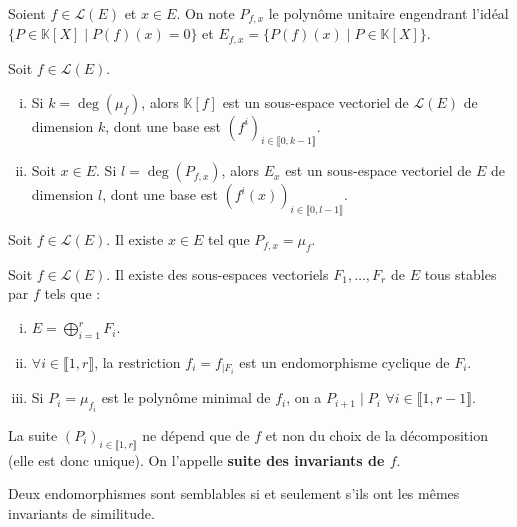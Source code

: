 	
	\begin{notation}
		Soient $f \in \mathcal{L}(E)$ et $x \in E$. On note $P_{f,x}$ le polynôme unitaire engendrant l'idéal $\{ P \in \mathbb{K}[X] \mid P(f)(x) = 0 \}$ et $E_{f,x} = \{ P(f)(x) \mid P \in \mathbb{K}[X] \}$.
	\end{notation}

	\begin{lemma}
		Soit $f \in \mathcal{L}(E)$.
		\begin{enumerate}[(i)]
			\item Si $k = \deg(\mu_f)$, alors $\mathbb{K}[f]$ est un sous-espace vectoriel de $\mathcal{L}(E)$ de dimension $k$, dont une base est $(f^i)_{i \in \llbracket 0, k-1 \rrbracket}$.
			\item Soit $x \in E$. Si $l = \deg(P_{f,x})$, alors $E_x$ est un sous-espace vectoriel de $E$ de dimension $l$, dont une base est $(f^i(x))_{i \in \llbracket 0, l-1 \rrbracket}$.
		\end{enumerate}
	\end{lemma}

	\begin{lemma}
		Soit $f \in \mathcal{L}(E)$. Il existe $x \in E$ tel que $P_{f,x} = \mu_f$.
	\end{lemma}

	
	\begin{theorem}[Frobenius]
		Soit $f \in \mathcal{L}(E)$. Il existe des sous-espaces vectoriels $F_1, \dots, F_r$ de $E$ tous stables par $f$ tels que :
		\begin{enumerate}[(i)]
			\item $E = \bigoplus_{i = 1}^r F_i$.
			\item $\forall i \in \llbracket 1, r \rrbracket$, la restriction $f_i = f_{|F_i}$ est un endomorphisme cyclique de $F_i$.
			\item Si $P_i = \mu_{f_i}$ est le polynôme minimal de $f_i$, on a $P_{i+1} \mid P_i$ $\forall i \in \llbracket 1, r-1 \rrbracket$.
		\end{enumerate}
		La suite $(P_i)_{i \in \llbracket 1, r \rrbracket}$ ne dépend que de $f$ et non du choix de la décomposition (elle est donc unique). On l'appelle \textbf{suite des invariants de $f$}.
	\end{theorem}

	\begin{corollary}
		Deux endomorphismes sont semblables si et seulement s'ils ont les mêmes invariants de similitude.
	\end{corollary}

